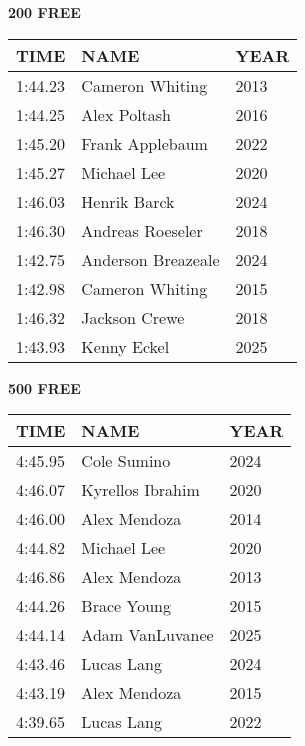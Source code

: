 \vspace{0.4cm}

\begin{minipage}[t]{0.48\textwidth}
\centering
\textbf{200 FREE}\\[0.05cm]
\begin{tabular}{@{}p{1.8cm}p{2.8cm}p{1.2cm}@{}}
\hline
\textbf{TIME} & \textbf{NAME} & \textbf{YEAR} \\
\hline
1:44.23 & Cameron Whiting & 2013 \\
1:44.25 & Alex Poltash & 2016 \\
1:45.20 & Frank Applebaum & 2022 \\
1:45.27 & Michael Lee & 2020 \\
1:46.03 & Henrik Barck & 2024 \\
1:46.30 & Andreas Roeseler & 2018 \\
1:42.75 & Anderson Breazeale & 2024 \\
1:42.98 & Cameron Whiting & 2015 \\
1:46.32 & Jackson Crewe & 2018 \\
1:43.93 & Kenny Eckel & 2025 \\
\hline
\end{tabular}
\end{minipage}\hfill
\begin{minipage}[t]{0.48\textwidth}
\centering
\textbf{500 FREE}\\[0.05cm]
\begin{tabular}{@{}p{1.8cm}p{2.8cm}p{1.2cm}@{}}
\hline
\textbf{TIME} & \textbf{NAME} & \textbf{YEAR} \\
\hline
4:45.95 & Cole Sumino & 2024 \\
4:46.07 & Kyrellos Ibrahim & 2020 \\
4:46.00 & Alex Mendoza & 2014 \\
4:44.82 & Michael Lee & 2020 \\
4:46.86 & Alex Mendoza & 2013 \\
4:44.26 & Brace Young & 2015 \\
4:44.14 & Adam VanLuvanee & 2025 \\
4:43.46 & Lucas Lang & 2024 \\
4:43.19 & Alex Mendoza & 2015 \\
4:39.65 & Lucas Lang & 2022 \\
\hline
\end{tabular}
\end{minipage}

\vspace{0.4cm}

